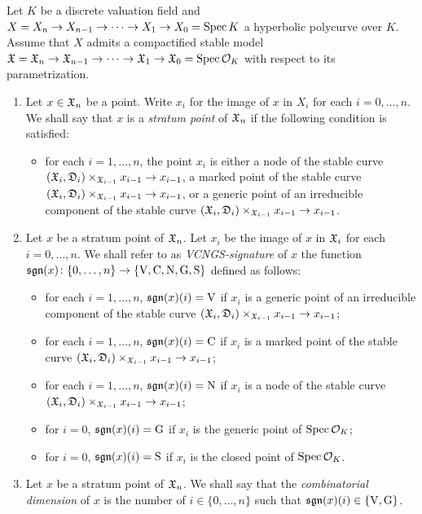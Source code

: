 \begin{defn}
  Let $K$ be a discrete valuation field and $X = X_n \to X_{n - 1} \to \cdots \to X_1 \to X_0 = \mathrm{Spec} \, K$ a hyperbolic polycurve over $K$. Assume that $X$ admits a compactified stable model $\mathfrak{X} = \mathfrak{X}_n \to \mathfrak{X}_{n - 1} \to \cdots \to \mathfrak{X}_1 \to \mathfrak{X}_0 = \mathrm{Spec} \, \mathcal{O}_K$ with respect to its parametrization.
  \begin{enumerate}
    \item Let $x \in \mathfrak{X}_n$ be a point. Write $x_i$ for the image of $x$ in $X_i$ for each $i = 0, \ldots, n$. We shall say that $x$ is a \emph{stratum point} of $\mathfrak{X}_n$ if the following condition is satisfied:
    \begin{itemize}
      \item for each $i = 1, \ldots, n$, the point $x_i$ is either a node of the stable curve $(\mathfrak{X}_i,  \mathfrak{D}_i) \times_{\mathfrak{X}_{i - 1}} x_{i - 1} \to x_{i - 1}$, a marked point of the stable curve $(\mathfrak{X}_i, \mathfrak{D}_i) \times_{\mathfrak{X}_{i - 1}} x_{i - 1} \to x_{i - 1}$, or a generic point of an irreducible component of the stable curve $(\mathfrak{X}_i, \mathfrak{D}_i) \times_{\mathfrak{X}_{i - 1}} x_{i - 1} \to x_{i - 1}$. 
    \end{itemize}
    \item Let $x$ be a stratum point of $\mathfrak{X}_n$. Let $x_i$ be the image of $x$ in $\mathfrak{X}_i$ for each $i = 0, \ldots, n$. We shall refer to as \emph{VCNGS-signature} of $x$ the function $\mathfrak{sgn}(x) \colon \{0, \ldots, n\} \to \{\mathrm{V}, \mathrm{C}, \mathrm{N}, \mathrm{G}, \mathrm{S}\}$ defined as follows:
    \begin{itemize}
      \item for each $i = 1, \ldots, n$, $\mathfrak{sgn}(x)(i) = \mathrm{V}$ if $x_i$ is a generic point of an irreducible component of the stable curve $(\mathfrak{X}_i, \mathfrak{D}_i) \times_{\mathfrak{X}_{i - 1}} x_{i - 1} \to x_{i - 1}$;
      \item for each $i = 1, \ldots, n$, $\mathfrak{sgn}(x)(i) = \mathrm{C}$ if $x_i$ is a marked point of the stable curve $(\mathfrak{X}_i, \mathfrak{D}_i) \times_{\mathfrak{X}_{i - 1}} x_{i - 1} \to x_{i - 1}$;
      \item for each $i = 1, \ldots, n$, $\mathfrak{sgn}(x)(i) = \mathrm{N}$ if $x_i$ is a node of the stable curve $(\mathfrak{X}_i, \mathfrak{D}_i) \times_{\mathfrak{X}_{i - 1}} x_{i - 1} \to x_{i - 1}$;
      \item for $i = 0$, $\mathfrak{sgn}(x)(i) = \mathrm{G}$ if $x_i$ is the generic point of $\mathrm{Spec} \, \mathcal{O}_K$;
      \item for $i = 0$, $\mathfrak{sgn}(x)(i) = \mathrm{S}$ if $x_i$ is the closed point of $\mathrm{Spec} \, \mathcal{O}_K$.
    \end{itemize}
  \item Let $x$ be a stratum point of $\mathfrak{X}_n$. We shall say that the \emph{combinatorial dimension} of $x$ is the number of $i \in \{0, \ldots, n\}$ such that $\mathfrak{sgn}(x)(i) \in \{\mathrm{V}, \mathrm{G}\}$.
  \end{enumerate}
\end{defn}


